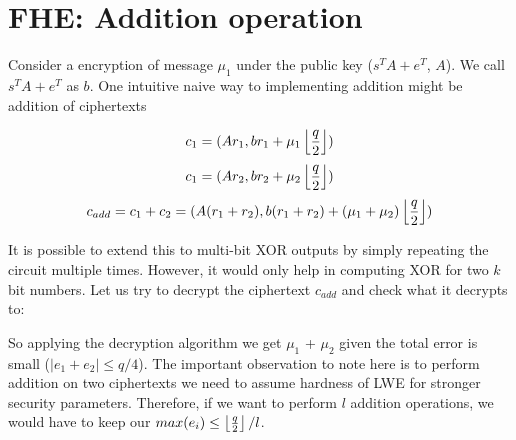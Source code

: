 \documentclass[usletter]{article}
\begin{document}
\section{FHE: Addition operation}

	Consider a encryption of message $\mu_1$ under the public key ($s^{T}A + e^{T}$, $A$). We call 
$s^{T}A + e^{T}$ as $b$. One intuitive naive way to implementing addition might be addition of 
ciphertexts

$$c_1 = ( Ar_1, br_1 + \mu_1\left\lfloor \frac{q}{2} \right\rfloor )$$
$$c_1 = ( Ar_2, br_2 + \mu_2\left\lfloor \frac{q}{2} \right\rfloor )$$
$$c_{add} = c_1 + c_2 = ( A(r_1 + r_2), b(r_1 +r_2) + (\mu_1 + \mu_2)\left\lfloor \frac{q}{2} \right\rfloor )$$

It is possible to extend this to multi-bit XOR outputs by simply repeating 
the circuit multiple times. However, it would only help in computing XOR for two $k$ bit numbers. 
Let us try to decrypt the ciphertext $c_{add}$ and check what it decrypts to:



So applying the decryption algorithm we get $\mu_1$ + $\mu_2$ given the total error
is small ($|e_1 +e_2| \leq q/4$). The important observation to note here is to perform addition on 
two ciphertexts we need to assume hardness of LWE for stronger security parameters. 
Therefore, if we want to perform $l$ addition operations, we would have to keep our $max(e_i) \leq \left\lfloor \frac{q}{2} \right\rfloor/l$.   
\end{document}
